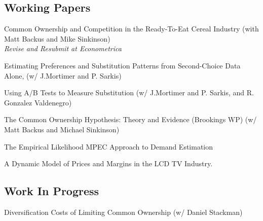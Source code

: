 \documentclass[letterpaper]{article}
\renewenvironment{itemize}{
  \begin{list}{}{
    \setlength{\leftmargin}{1.5em}
  }
}{
  \end{list}
}
\begin{document}
\subsection*{Working Papers}
\begin{itemize}
\item Common Ownership and Competition in the Ready-To-Eat Cereal Industry (with Matt Backus and Mike Sinkinson)  \\\textit{Revise and Resubmit at Econometrica} 
\item Estimating Preferences and Substitution Patterns from Second-Choice Data Alone, (w/ J.Mortimer and P. Sarkis) 
\item Using A/B Tests to Measure Substitution (w/ J.Mortimer and P. Sarkis, and R. Gonzalez Valdenegro) 
\item The Common Ownership Hypothesis: Theory and Evidence (Brookings WP) (w/ Matt Backus and Michael Sinkinson) 
\item The Empirical Likelihood MPEC Approach to Demand Estimation\\ %
\item A Dynamic Model of Prices and Margins in the LCD TV Industry. 
\end{itemize}

\subsection*{Work In Progress}
\begin{itemize}
\item Diversification Costs of Limiting Common Ownership (w/ Daniel Stackman)
\end{itemize}
\end{document}
